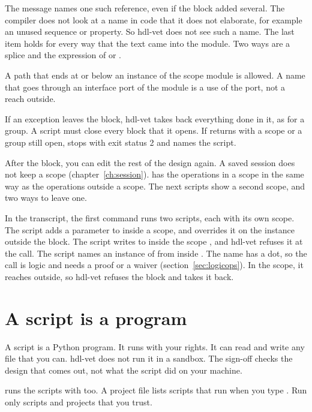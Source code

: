 The message names one such reference, even if the block added several. The compiler
does not look at a name in code that it does not elaborate, for example an unused
sequence or property. So hdl-vet does not see such a name. The last item holds for every
way that the text came into the module. Two ways are a splice and the expression of
 or .

A path that ends at or below an instance of the scope module is allowed. A name that
goes through an interface port of the module is a use of the port, not a reach outside.

If an exception leaves the block, hdl-vet takes back everything done in it, as for a
group. A script must close every block that it opens. If  returns with a
scope or a group still open,  stops with exit status 2 and names the
script.

After the block, you can edit the rest of the design again. A saved session does not
keep a scope (chapter~\ref{ch:session}).  has the operations in a scope in
the same way as the operations outside a scope. The next scripts show a second scope,
and two ways to leave one.







In the transcript, the first command runs two scripts, each with its own scope. The
script  adds a parameter
to  inside a scope, and overrides it on the instance outside the
block. The script  writes to  inside the scope
, and hdl-vet refuses it at the call. The script 
names an instance of  from inside . The name has a dot,
so the call is logic and needs a proof or a waiver (section~\ref{sec:logicops}). In the scope, it reaches outside, so hdl-vet refuses
the block and takes it back.

\section{A script is a program}
\label{sec:program}

A script is a Python program. It runs with your rights. It can read and write any file
that you can. hdl-vet does not run it in a sandbox. The sign-off checks the design that
comes out, not what the script did on your machine.

 runs the scripts with  too. A project file lists scripts
that run when you type . Run only scripts and projects that you trust.
